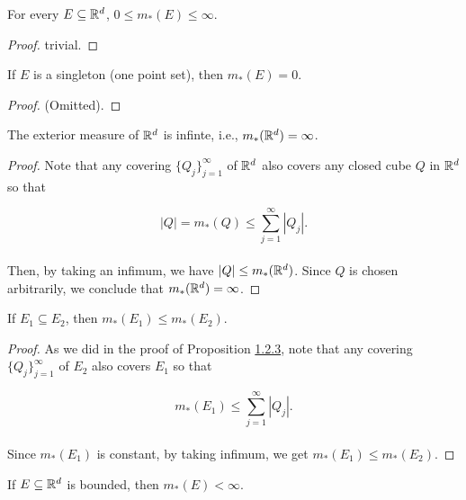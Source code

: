 \documentclass[12pt, a4paper, openany, twoside]{book}
\theoremstyle{definition}
\theoremstyle{remark}
\theoremstyle{plain}
\numberwithin{equation}{section}
\begin{document}
\vspace{5mm}
\begin{tcolorbox}[colback=yellow!10!white,colframe=brown!75!black,title=Proposition 1.2.1]\label{Proposition 1.2.1}
    For every $E\subseteq{\mathbb {R}}^d$, $0\leq m_*(E)\leq\infty$.
\end{tcolorbox}
\begin{proof}
    trivial.
\end{proof}
\vspace{5mm}
\begin{tcolorbox}[colback=yellow!10!white,colframe=brown!75!black,title=Proposition 1.2.2]\label{Proposition 1.2.2}
    If $E$ is a singleton (one point set), then $m_*(E)=0$.
\end{tcolorbox}
\begin{proof}
    (Omitted).
\end{proof}
\begin{tcolorbox}[colback=yellow!10!white,colframe=brown!75!black,title=Proposition 1.2.3]\label{Proposition 1.2.3}
    The exterior measure of ${\mathbb {R}}^d$ is infinte, i.e., $m_*({\mathbb {R}}^d)=\infty$.
\end{tcolorbox}
\begin{proof}
    Note that any covering $\{Q_j\}_{j=1}^{\infty}$ of ${\mathbb {R}}^d$ also covers any closed cube $Q$ in ${\mathbb {R}}^d$ so that

    \[|Q|=m_*(Q)\leq \sum_{j=1}^{\infty}{|Q_j|}.\]
    \\
    Then, by taking an infimum, we have $|Q|\leq m_*({\mathbb {R}}^d)$. Since $Q$ is chosen arbitrarily, we conclude that $m_*({\mathbb {R}}^d)=\infty$.
\end{proof}
\vspace{5mm}
\begin{tcolorbox}[colback=yellow!10!white,colframe=red!75!black,title=Theorem 1.2.4 (Monotonicity)]\label{Theorem 1.2.4}
    If $E_1\subseteq E_2$, then $m_*(E_1)\leq m_*(E_2)$.
\end{tcolorbox}
\begin{proof}
    As we did in the proof of Proposition \hyperref[Proposition 1.2.3]{1.2.3}, note that any covering $\{Q_j\}_{j=1}^{\infty}$ of $E_2$ also covers $E_1$ so that 

    \[m_*(E_1)\leq \sum_{j=1}^{\infty}{|Q_j|}.\]
    \\
    Since $m_*(E_1)$ is constant, by taking infimum, we get $m_*(E_1)\leq m_*(E_2)$.
\end{proof}
\vspace{5mm}
\begin{tcolorbox}[colback=yellow!10!white,colframe=red!75!black,title=Corollary 1.2.5]\label{Corollary 1.2.5}
    If $E\subseteq{\mathbb {R}}^d$ is bounded, then $m_*(E)<\infty$.
\end{tcolorbox}
\end{document}
